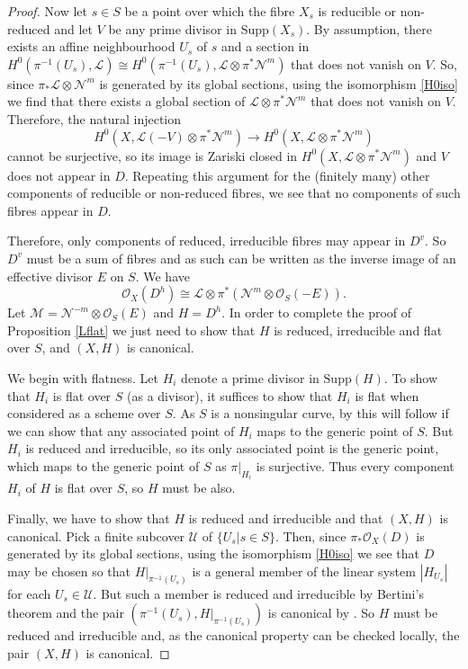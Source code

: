 \documentclass{amsart}
\begin{document}
\begin{proof}
Now let $s \in S$ be a point over which the fibre $X_s$ is reducible or non-reduced and let $V$ be any prime divisor in $\mathrm{Supp}(X_s)$. By assumption, there exists an affine neighbourhood $U_s$ of $s$ and a section in $H^0({\pi}^{-1}(U_s),{\mathcal{L}}) \cong H^0({\pi}^{-1}(U_s),{\mathcal{L}} \otimes {\pi}^*{\mathcal{N}}^m)$ that does not vanish on $V$. So, since ${\pi}_*{\mathcal{L}} \otimes {\mathcal{N}}^m$ is generated by its global sections, using the isomorphism \eqref{H0iso} we find that there exists a global section of ${\mathcal{L}} \otimes {\pi}^*{\mathcal{N}}^m$ that does not vanish on $V$. Therefore, the natural injection
\[H^0(X, {\mathcal{L}}(-V) \otimes {\pi}^*{\mathcal{N}}^m) \longrightarrow H^0(X, {\mathcal{L}} \otimes {\pi}^*{\mathcal{N}}^m)\]
cannot be surjective, so its image is Zariski closed in $H^0(X, {\mathcal{L}} \otimes {\pi}^*{\mathcal{N}}^m)$ and $V$ does not appear in $D$. Repeating this argument for the (finitely many) other components of reducible or non-reduced fibres, we see that no components of such fibres appear in $D$.

Therefore, only components of reduced, irreducible fibres may appear in $D^v$. So $D^v$ must be a sum of fibres and as such can be written as the inverse image of an effective divisor $E$ on $S$. We have
\[{\mathcal{O}}_X(D^h) \cong {\mathcal{L}} \otimes {\pi}^*({\mathcal{N}}^m \otimes {\mathcal{O}}_{S}(-E)).\]
Let ${\mathcal{M}} = {\mathcal{N}}^{-m} \otimes {\mathcal{O}}_{S}(E)$ and $H = D^h$. In order to complete the proof of Proposition \ref{Lflat} we just need to show that $H$ is reduced, irreducible and flat over $S$, and $(X,H)$ is canonical.

We begin with flatness. Let $H_i$ denote a prime divisor in $\mathrm{Supp}(H)$. To show that $H_i$ is flat over $S$ (as a divisor), it suffices to show that $H_i$ is flat when considered as a scheme over $S$. As $S$ is a nonsingular curve, by \cite[Proposition III.9.7]{hart} this will follow if we can show that any associated point of $H_i$ maps to the generic point of $S$. But $H_i$ is reduced and irreducible, so its only associated point is the generic point, which maps to the generic point of $S$ as ${\pi}|_{H_i}$ is surjective. Thus every component $H_i$ of $H$ is flat over $S$, so $H$ must be also. 

Finally, we have to show that $H$ is reduced and irreducible and that $(X,H)$ is canonical. Pick a finite subcover $\mathcal{U}$ of $\{U_s|s \in S\}$. Then, since $\pi_*{\mathcal{O}}_X(D)$ is generated by its global sections, using the isomorphism \eqref{H0iso} we see that $D$ may be chosen so that $H|_{\pi^{-1}(U_s)}$ is a general member of the linear system $|H_{U_s}|$ for each $U_s \in \mathcal{U}$. But such a member is reduced and irreducible by Bertini's theorem and the pair $({\pi^{-1}(U_s)},H|_{\pi^{-1}(U_s)})$ is canonical by \cite[Corollary 2.33]{bgav}. So $H$ must be reduced and irreducible and, as the canonical property can be checked locally, the pair $(X,H)$ is canonical. \end{proof}
\end{document}
